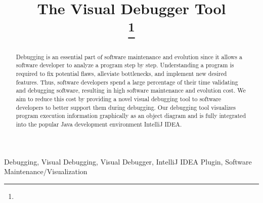 \documentclass[conference]{IEEEtran}
\newcommand{\intellij}{IntelliJ IDEA}
\begin{document}
\title{The Visual Debugger Tool\\
{}
\thanks{}
}
\author{
}

\maketitle
\begin{abstract}
Debugging is an essential part of software maintenance and evolution since it allows a software developer to analyze a program step by step.
Understanding a program is required to fix potential flaws, alleviate bottlenecks, and implement new desired features.
Thus, software developers spend a large percentage of their time validating and debugging software, resulting in high software maintenance and evolution cost.
We aim to reduce this cost by providing a novel visual debugging tool to software developers to better support them during debugging.
Our debugging tool visualizes program execution information graphically as an object diagram and is fully integrated into the popular Java development environment \intellij{}.
\end{abstract}

\begin{IEEEkeywords}
Debugging, Visual Debugging, Visual Debugger, IntelliJ IDEA Plugin, Software Maintenance/Visualization
\end{IEEEkeywords}
\end{document}
